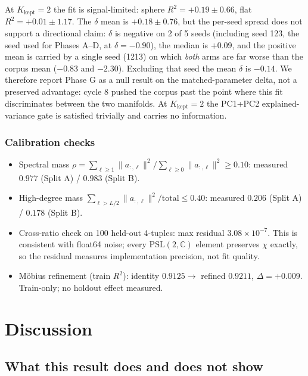 \documentclass[11pt,a4paper]{article}
\begin{document}
At $K_\text{kept}=2$ the fit is signal-limited: sphere $R^2 = +0.19 \pm 0.66$, flat $R^2 = +0.01 \pm 1.17$. The $\delta$ mean is $+0.18 \pm 0.76$, but the per-seed spread does not support a directional claim: $\delta$ is negative on 2 of 5 seeds (including seed 123, the seed used for Phases A--D, at $\delta = -0.90$), the median is $+0.09$, and the positive mean is carried by a single seed (1213) on which \emph{both} arms are far worse than the corpus mean ($-0.83$ and $-2.30$). Excluding that seed the mean $\delta$ is $-0.14$. We therefore report Phase G as a null result on the matched-parameter delta, not a preserved advantage: cycle 8 pushed the corpus past the point where this fit discriminates between the two manifolds. At $K_\text{kept}=2$ the PC1+PC2 explained-variance gate is satisfied trivially and carries no information.

\subsubsection{Calibration checks}

\begin{itemize}
\item Spectral mass $\rho = \sum_{\ell \geq 1} \|a_{:,\ell}\|^2 / \sum_{\ell \geq 0} \|a_{:,\ell}\|^2 \geq 0.10$: measured $0.977$ (Split A) / $0.983$ (Split B).
\item High-degree mass $\sum_{\ell > L/2} \|a_{:,\ell}\|^2 / \mathrm{total} \leq 0.40$: measured $0.206$ (Split A) / $0.178$ (Split B).
\item Cross-ratio check on 100 held-out 4-tuples: max residual $3.08 \times 10^{-7}$. This is consistent with float64 noise; every $\mathrm{PSL}(2,\mathbb{C})$ element preserves $\chi$ exactly, so the residual measures implementation precision, not fit quality.
\item M\"obius refinement (train $R^2$): identity $0.9125 \rightarrow$ refined $0.9211$, $\Delta = +0.009$. Train-only; no holdout effect measured.
\end{itemize}

\section{Discussion}


\subsection{What this result does and does not show}
\end{document}
